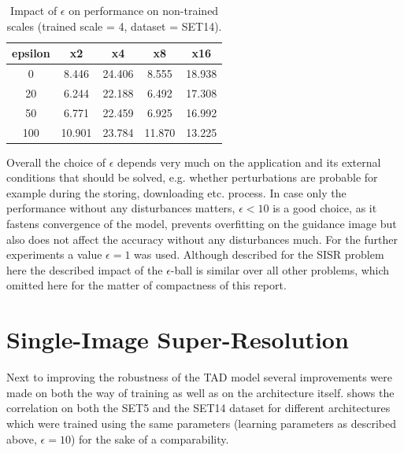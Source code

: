 \begin{table}[!htbp]
	\begin{center}
	\begin{tabular}{c|c|c|c|c}
	epsilon & x2 & x4 & x8 & x16 \\
	\hline
	0 & 8.446 & 24.406 & 8.555 & 18.938 \\
	20 & 6.244 & 22.188 & 6.492 & 17.308 \\
	50 & 6.771 & 22.459 & 6.925 & 16.992 \\
	100 & 10.901 & 23.784 & 11.870 & 13.225 \\
	\end{tabular}
	\caption{Impact of $\epsilon$ on performance on non-trained scales
	(trained scale = 4, dataset = SET14).}
	\label{table:epsilonotherscales}
	\end{center}
\end{table}

Overall the choice of $\epsilon$ depends very much on the application and its external conditions that should be solved, e.g. whether perturbations are probable for example during the storing, downloading etc. process.
In case only the performance without any disturbances matters, $\epsilon < 10$ is a good choice, as it fastens convergence of the model, prevents overfitting on the guidance image but also does not affect the accuracy without any disturbances much. For the further experiments a value $\epsilon = 1$ was used.
\newline
Although described for the \ac{SISR} problem here the described impact of
the $\epsilon$-ball is similar over all other problems, which omitted here for the matter of compactness of this report.

\section{Single-Image Super-Resolution}
\label{sec:Experiments_SISR}
Next to improving the robustness of the \ac{TAD} model several improvements were made on both the way of training as well as on the architecture itself.  shows the correlation on both the SET5 and the SET14 dataset for different architectures which were trained using the same parameters (learning parameters as described above, $\epsilon = 10$) for the sake of a comparability.

